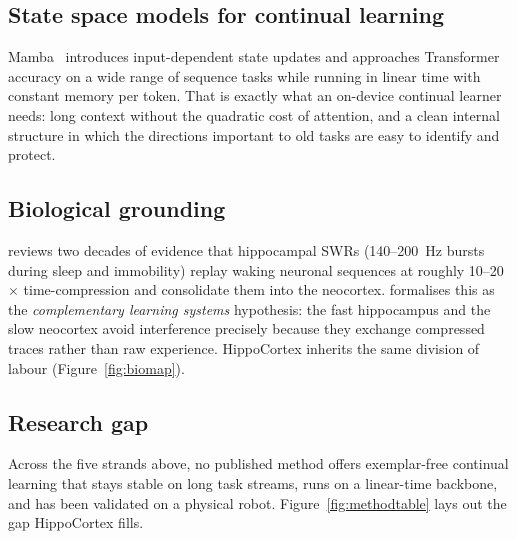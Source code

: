 \documentclass[11pt,a4paper]{article}
\begin{document}
\subsection{State space models for continual learning}
Mamba~\citep{gu2023mamba} introduces input-dependent state updates and approaches Transformer accuracy on a wide range of sequence tasks while running in linear time with constant memory per token. That is exactly what an on-device continual learner needs: long context without the quadratic cost of attention, and a clean internal structure in which the directions important to old tasks are easy to identify and protect.

\subsection{Biological grounding}
\citet{buzsaki2015hippocampal} reviews two decades of evidence that hippocampal SWRs (140--200~Hz bursts during sleep and immobility) replay waking neuronal sequences at roughly 10--20$\times$ time-compression and consolidate them into the neocortex. \citet{mcclelland1995complementary} formalises this as the \emph{complementary learning systems} hypothesis: the fast hippocampus and the slow neocortex avoid interference precisely because they exchange compressed traces rather than raw experience. HippoCortex inherits the same division of labour (Figure~\ref{fig:biomap}).

\subsection{Research gap}
Across the five strands above, no published method offers exemplar-free continual learning that stays stable on long task streams, runs on a linear-time backbone, and has been validated on a physical robot. Figure~\ref{fig:methodtable} lays out the gap HippoCortex fills.
\end{document}
